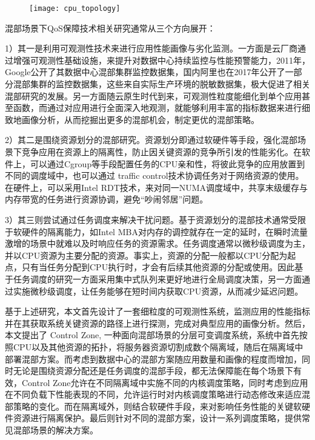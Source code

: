 \begin{figure}[!htbp]
    \centering
    \texttt{[image: cpu\_topology]}
    \label{fig:cpu_topology}
\end{figure}

混部场景下QoS保障技术相关研究通常从三个方向展开：

1）其一是利用可观测性技术来进行应用性能画像与劣化监测。一方面是云厂商通过增强可观测性基础设施，来提升对数据中心持续监控与性能预警能力，2011年，Google公开了其数据中心混部集群监控数据集，国内阿里也在2017年公开了一部分混部集群的监控数据集\citep{guo2019limits}，这些来自实际生产环境的脱敏数据集，极大促进了相关混部研究的发展。另一方面随云原生时代到来，可观测性粒度能细化到单个应用甚至函数，而通过对应用进行全面深入地观测，就能够利用丰富的指标数据来进行细致地画像分析，从而挖掘出更多的混部机会，制定更优的混部策略。

2）其二是围绕资源划分的混部研究。资源划分即通过软硬件等手段，强化混部场景下竞争应用在资源上的隔离性，防止因关键资源的竞争所引发的性能劣化。在软件上，可以通过Cgroup等手段配置任务的CPU亲和性，将彼此竞争的应用放置到不同的调度域中，也可以通过 traffic control技术\citep{hubert2002linux}协调任务对于网络资源的使用。在硬件上，可以采用Intel RDT技术\citep{guide2011intel}，来对同一NUMA调度域中，共享末级缓存与内存带宽的任务进行资源协调，避免“吵闹邻居”问题\citep{xu2018dcat, maricq2018taming, rzadca2020autopilot, kwon2020dc}。

3）其三则尝试通过任务调度来解决干扰问题。基于资源划分的混部技术通常受限于软硬件的隔离能力，如Intel MBA对内存的调控就存在一定的延时\citep{herdrich2016cache}，在瞬时流量激增的场景中就难以及时响应任务的资源需求。任务调度通常以微秒级调度为主，并以CPU资源为主要分配的资源。事实上，资源的分配一般都以CPU分配为起点，只有当任务分配到CPU执行时，才会有后续其他资源的分配或使用。因此基于任务调度的研究一方面采用集中式队列来更好地进行全局调度决策，另一方面通过实施微秒级调度，让任务能够在短时间内获取CPU资源，从而减少延迟问题。

基于上述研究，本文首先设计了一套细粒度的可观测性系统，监测应用的性能指标并在其获取系统关键资源的路径上进行探测，完成对典型应用的画像分析。然后，本文提出了 Control Zone, 一种面向混部场景的分层可变调度系统，系统中首先按照CPU以及其他资源的拓扑，将服务器资源切割成数个隔离域，随后在隔离域中部署混部方案。而考虑到数据中心的混部方案随应用数量和画像的程度而增加，同时无论是围绕资源分配还是任务调度的混部手段，都无法保障能在每个场景下有效，Control Zone允许在不同隔离域中实施不同的内核调度策略，同时考虑到应用在不同负载下性能表现的不同，允许运行时对内核调度策略进行动态修改来适应混部策略的变化。而在隔离域外，则结合软硬件手段，来对影响任务性能的关键软硬件资源进行隔离保护。最后则针对不同的混部方案，设计一系列调度策略，提供常见混部场景的解决方案。


